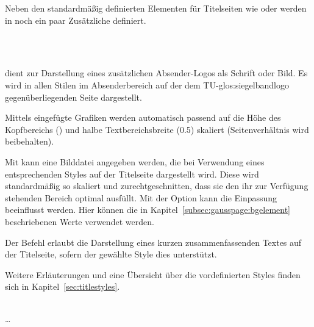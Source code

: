 Neben den standardmäßig definierten Elementen für Titelseiten wie 
oder  werden in \tubslatex noch ein paar Zusätzliche definiert.

\begin{Declaration}
  \\
  \\
\end{Declaration}

\begin{minipage}[t]{0.6\textwidth}
   dient zur Darstellung eines zusätzlichen Absender-Logos als Schrift
  oder Bild. Es wird in allen Stilen im Absenderbereich auf der dem
  TU-\gls{glos:siegelbandlogo} gegenüberliegenden Seite dargestellt.
  
  Mittels  eingefügte Grafiken werden automatisch
  passend auf die Höhe des Kopfbereichs () und
  halbe Textbereichsbreite (0.5) skaliert
  (Seitenverhältnis wird beibehalten).
\end{minipage}
\hfill
\begin{minipage}[t]{0.3\textwidth}
  \vspace*{-1ex}%
\end{minipage}

Mit  kann eine Bilddatei angegeben werden, die bei
Verwendung eines entsprechenden Styles auf der Titelseite dargestellt wird.
Diese wird standardmäßig so skaliert und zurechtgeschnitten, dass sie den ihr
zur Verfügung stehenden Bereich optimal ausfüllt.
Mit der Option  kann die Einpassung beeinflusst werden.
Hier können die in Kapitel~\ref{subsec:gausspage:bgelement} beschriebenen Werte
verwendet werden.

Der Befehl  erlaubt die Darstellung eines kurzen
zusammenfassenden Textes auf der Titelseite, sofern der gewählte Style
dies unterstützt.

Weitere Erläuterungen und eine Übersicht über die vordefinierten Styles
finden sich in Kapitel~\ref{sec:titlestyles}.


\begin{Declaration}
  \\
  \quad\dots\\
\end{Declaration}

